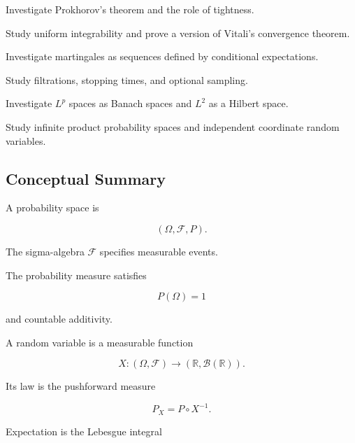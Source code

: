 \begin{exercise}[4]
Investigate Prokhorov's theorem and the role of tightness.
\end{exercise}

\begin{exercise}[4]
Study uniform integrability and prove a version of Vitali's convergence
theorem.
\end{exercise}

\begin{exercise}[4]
Investigate martingales as sequences defined by conditional
expectations.
\end{exercise}

\begin{exercise}[4]
Study filtrations, stopping times, and optional sampling.
\end{exercise}

\begin{exercise}[4]
Investigate \(L^p\) spaces as Banach spaces and \(L^2\) as a Hilbert
space.
\end{exercise}

\begin{exercise}[4]
Study infinite product probability spaces and independent coordinate
random variables.
\end{exercise}

\subsection{Conceptual Summary}
\label{subsec:measure-probability-summary}

A probability space is

\[
\boxed{
(\Omega,\mathcal{F},P).
}
\]

The sigma-algebra \(\mathcal{F}\) specifies measurable events.

The probability measure satisfies

\[
\boxed{
P(\Omega)=1
}
\]

and countable additivity.

A random variable is a measurable function

\[
\boxed{
X:
(\Omega,\mathcal{F})
\to
(\mathbb{R},\mathcal{B}(\mathbb{R})).
}
\]

Its law is the pushforward measure

\[
\boxed{
P_X
=
P\circ X^{-1}.
}
\]

Expectation is the Lebesgue integral

